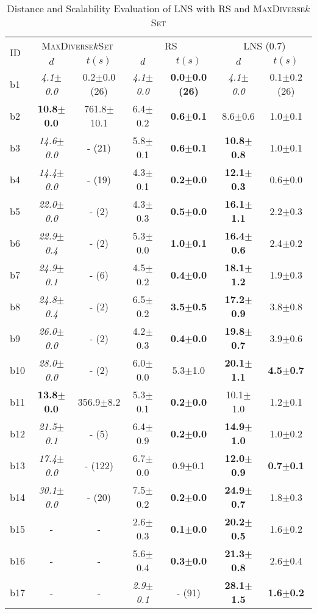 \begin{longtable}{|l|c|c|c|c|c|c|}
\caption{\label{tab:dist_max_rs_lns} Distance and Scalability Evaluation of \ac{LNS} with \ac{RS} and \textsc{MaxDiverse$k$Set}}\\
\hline
\multirow{2}{*}{ID}&\multicolumn{2}{c|}{\textsc{MaxDiverse$k$Set}}&\multicolumn{2}{c|}{{RS}}&\multicolumn{2}{c|}{LNS (0.7)}\\
\cline{2-7}
&$d$&$t(s)$&$d$&$t(s)$&$d$&$t(s)$\\
\hline
b1&\textit{4.1$\pm$0.0} & 0.2$\pm$0.0 (26)&\textit{4.1$\pm$0.0} & \textbf{0.0$\pm$0.0 (26)}&\textit{4.1$\pm$0.0} & 0.1$\pm$0.2 (26)
\\
b2&\textbf{10.8$\pm$0.0} & 761.8$\pm$10.1&6.4$\pm$0.2 & \textbf{0.6$\pm$0.1}&8.6$\pm$0.6 & 1.0$\pm$0.1
\\
b3&\textit{14.6$\pm$0.0} & - (21)&5.8$\pm$0.1 & \textbf{0.6$\pm$0.1}&\textbf{10.8$\pm$0.8} & 1.0$\pm$0.1
\\
b4&\textit{14.4$\pm$0.0} & - (19)&4.3$\pm$0.1 & \textbf{0.2$\pm$0.0}&\textbf{12.1$\pm$0.3} & 0.6$\pm$0.0
\\
b5&\textit{22.0$\pm$0.0} & - (2)&4.3$\pm$0.3 & \textbf{0.5$\pm$0.0}&\textbf{16.1$\pm$1.1} & 2.2$\pm$0.3
\\
b6&\textit{22.9$\pm$0.4} & - (2)&5.3$\pm$0.0 & \textbf{1.0$\pm$0.1}&\textbf{16.4$\pm$0.6} & 2.4$\pm$0.2
\\
b7&\textit{24.9$\pm$0.1} & - (6)&4.5$\pm$0.2 & \textbf{0.4$\pm$0.0}&\textbf{18.1$\pm$1.2} & 1.9$\pm$0.3
\\
b8&\textit{24.8$\pm$0.4} & - (2)&6.5$\pm$0.2 & \textbf{3.5$\pm$0.5}&\textbf{17.2$\pm$0.9} & 3.8$\pm$0.8
\\
b9&\textit{26.0$\pm$0.0} & - (2)&4.2$\pm$0.3 & \textbf{0.4$\pm$0.0}&\textbf{19.8$\pm$0.7} & 3.9$\pm$0.6
\\
b10&\textit{28.0$\pm$0.0} & - (2)&6.0$\pm$0.0 & 5.3$\pm$1.0&\textbf{20.1$\pm$1.1} & \textbf{4.5$\pm$0.7}
\\
b11&\textbf{13.8$\pm$0.0} & 356.9$\pm$8.2&5.3$\pm$0.1 & \textbf{0.2$\pm$0.0}&10.1$\pm$1.0 & 1.2$\pm$0.1
\\
b12&\textit{21.5$\pm$0.1} & - (5)&6.4$\pm$0.9 & \textbf{0.2$\pm$0.0}&\textbf{14.9$\pm$1.0} & 1.0$\pm$0.2
\\
b13&\textit{17.4$\pm$0.0} & - (122)&6.7$\pm$0.0 & 0.9$\pm$0.1&\textbf{12.0$\pm$0.9} & \textbf{0.7$\pm$0.1}
\\
b14&\textit{30.1$\pm$0.0} & - (20)&7.5$\pm$0.2 & \textbf{0.2$\pm$0.0}&\textbf{24.9$\pm$0.7} & 1.8$\pm$0.3
\\
b15&- & -&2.6$\pm$0.3 & \textbf{0.1$\pm$0.0}&\textbf{20.2$\pm$0.5} & 1.6$\pm$0.2
\\
b16&- & -&5.6$\pm$0.4 & \textbf{0.3$\pm$0.0}&\textbf{21.3$\pm$0.8} & 2.6$\pm$0.4
\\
b17&- & -&\textit{2.9$\pm$0.1} & - (91)&\textbf{28.1$\pm$1.5} & \textbf{1.6$\pm$0.2}
\\
\hline
\end{longtable}

